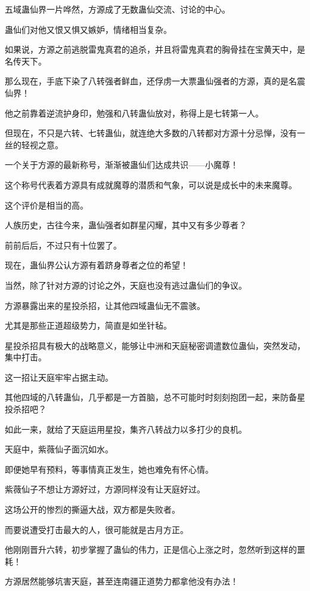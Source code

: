 \begin{this_body}
五域蛊仙界一片哗然，方源成了无数蛊仙交流、讨论的中心。

蛊仙们对他又恨又惧又嫉妒，情绪相当复杂。

如果说，方源之前逃脱雷鬼真君的追杀，并且将雷鬼真君的胸骨挂在宝黄天中，是名传天下。

那么现在，手底下染了八转强者鲜血，还俘虏一大票蛊仙强者的方源，真的是名震仙界！

他之前靠着逆流护身印，勉强和八转蛊仙放对，称得上是七转第一人。

但现在，不只是六转、七转蛊仙，就连绝大多数的八转都对方源十分忌惮，没有一丝的轻视之意。

一个关于方源的最新称号，渐渐被蛊仙们达成共识——小魔尊！

这个称号代表着方源具有成就魔尊的潜质和气象，可以说是成长中的未来魔尊。

这个评价是相当的高。

人族历史，古往今来，蛊仙强者如群星闪耀，其中又有多少尊者？

前前后后，不过只有十位罢了。

现在，蛊仙界公认方源有着跻身尊者之位的希望！

当然，除了针对方源的讨论之外，天庭也没有逃过蛊仙们的争议。

方源暴露出来的星投杀招，让其他四域蛊仙无不震骇。

尤其是那些正道超级势力，简直是如坐针毡。

星投杀招具有极大的战略意义，能够让中洲和天庭秘密调遣数位蛊仙，突然发动，集中打击。

这一招让天庭牢牢占据主动。

其他四域的八转蛊仙，几乎都是一方首脑，总不可能时时刻刻抱团一起，来防备星投杀招吧？

如此一来，就给了天庭运用星投，集齐八转战力以多打少的良机。

天庭中，紫薇仙子面沉如水。

即便她早有预料，等事情真正发生，她也难免有怀心情。

紫薇仙子不想让方源好过，方源同样没有让天庭好过。

这场公开的惨烈的撕逼大战，双方都是失败者。

而要说遭受打击最大的人，很可能就是古月方正。

他刚刚晋升六转，初步掌握了蛊仙的伟力，正是信心上涨之时，忽然听到这样的噩耗！

方源居然能够坑害天庭，甚至连南疆正道势力都拿他没有办法！


\end{this_body}
